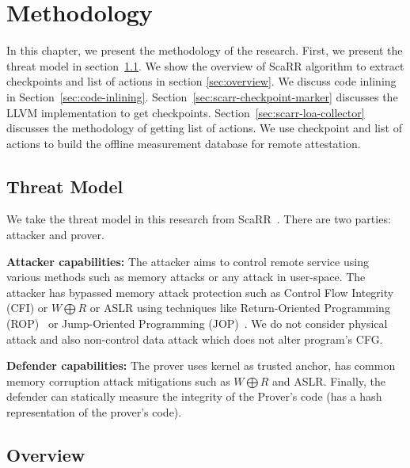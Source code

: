 
\chapter{Methodology} %

\label{Chapter4} %

In this chapter, we present the methodology of the research. First, we present
the threat model in section~\ref{sec:threat-model}.  We show the overview of
ScaRR algorithm to extract checkpoints and list of actions in section
\ref{sec:overview}. We discuss code inlining in Section~\ref{sec:code-inlining}.
Section~\ref{sec:scarr-checkpoint-marker} discusses the LLVM implementation to
get checkpoints. Section~\ref{sec:scarr-loa-collector} discusses the methodology
of getting list of actions.  We use checkpoint and list of actions to build the
offline measurement database for remote attestation. 

\section{Threat Model}
\label{sec:threat-model}

We take the threat model in this research from
ScaRR~\cite{toffaliniScaRRScalableRuntime2019}. There are two parties: attacker
and prover. 

\vspace{0.5cm}
\noindent \textbf{Attacker capabilities:} The attacker aims to control remote
service using various methods such as memory attacks or any attack in
user-space. The attacker has bypassed memory attack protection such as Control
Flow Integrity (CFI) or \( W \bigoplus R \) or ASLR using techniques like
Return-Oriented Programming
(ROP)~\cite{roemerReturnorientedProgrammingSystems2012} or Jump-Oriented
Programming (JOP)~\cite{bletschJumpOrientedProgrammingNew2011}. We do not
consider physical attack and also non-control data attack which does not alter
program's CFG.

\vspace{0.5cm}
\noindent \textbf{Defender capabilities:} The prover uses kernel as trusted
anchor, has common memory corruption attack mitigations such as \( W \bigoplus R
\) and ASLR. Finally, the defender can statically measure the integrity of the
Prover's code (\ie has a hash representation of the prover's code).


\section{Overview}\
\label{sec:overview}

